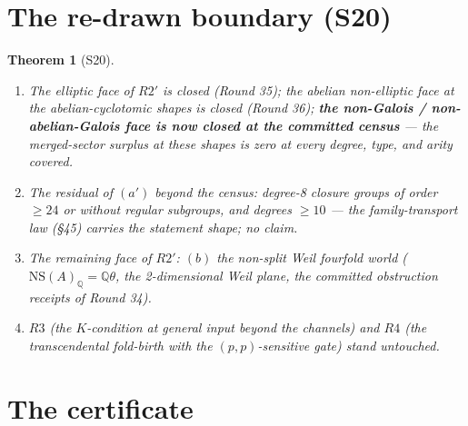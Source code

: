 \documentclass[11pt]{article}
\newtheorem{theorem}{Theorem}[section]
\begin{document}
\section{The re-drawn boundary (S20)}

\begin{theorem}[S20]
\begin{enumerate}
\item[(i)] The elliptic face of $R2'$ is closed (Round 35); the abelian
non-elliptic face at the abelian-cyclotomic shapes is closed (Round 36);
\textbf{the non-Galois / non-abelian-Galois face is now closed at the
committed census} --- the merged-sector surplus at these shapes is
\emph{zero} at every degree, type, and arity covered.
\item[(ii)] The residual of $(a')$ beyond the census: degree-8 closure
groups of order $\ge24$ or without regular subgroups, and degrees $\ge10$
--- the family-transport law (\S45) carries the statement shape; no claim.
\item[(iii)] The remaining face of $R2'$: $(b)$ the non-split Weil
fourfold world ($\mathrm{NS}(A)_{\mathbb Q}=\mathbb Q\theta$, the
2-dimensional Weil plane, the committed obstruction receipts of Round 34).
\item[(iv)] $R3$ (the $K$-condition at general input beyond the channels)
and $R4$ (the transcendental fold-birth with the $(p,p)$-sensitive gate)
stand untouched.
\end{enumerate}
\end{theorem}

\section*{The certificate}
\end{document}
